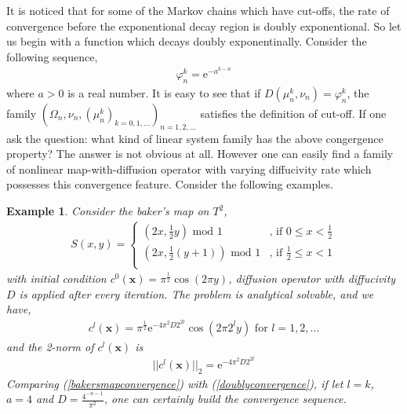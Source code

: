 \documentclass{article}
\newtheorem{example}{Example}
\begin{document}
It is noticed that for some of the Markov chains which have
cut-offs, the rate of convergence before the exponentional decay
region is doubly exponentional. So let us begin with a function
which decays doubly exponentinally. Consider the following sequence,
 \begin{eqnarray}
 \label{doublyconvergence}
 \varphi^k_n = \text{e}^{-a^{k-n}}
 \end{eqnarray}
 where $a>0$ is a real number. It is easy to see that if $D(\mu^k_n,\nu_n)=\varphi^k_n
 $, the family $(\Omega_n,\nu_n, (\mu^k_n)_{k=0,1,...})_{n=1,2,...}$ satisfies the definition of cut-off. If
 one ask the question: what kind of linear system family has the above
 congergence property? The answer is not obvious at all. However one
 can easily find a family of nonlinear map-with-diffusion operator with varying diffucivity rate which possesses this
 convergence feature. Consider the following examples.

\begin{example}

Consider the baker's map on $T^2$,
  \begin{eqnarray}
    S(x,y) =  \left\{ \begin{array}{cc}
                 (2x,\frac{1}{2}y) \mbox{ mod } 1      &\mbox{, if } 0\le x < \frac{1}{2} \\
                 (2x,\frac{1}{2}(y+1)) \mbox{ mod } 1  &\mbox{, if } \frac{1}{2}\le x< 1\\
              \end{array} \right.
  \end{eqnarray}
with initial condition $c^0(\mathbf{x})= \pi^{\frac{1}{2}}\cos(2 \pi
y)$, diffusion operator with diffucivity $D$ is applied after every
iteration. The problem is analytical solvable, and we have,
  \begin{eqnarray}
   c^l(\mathbf{x}) = \pi^{\frac{1}{2}}\text{e}^{-4 \pi^2 D 2 ^{2 l}}\cos(2 \pi 2^l
   y) \mbox{ for }l = 1,2,...
  \end{eqnarray}
and the 2-norm of $c^l(\mathbf{x})$ is
  \begin{eqnarray}
  \label{bakersmapconvergence}
   ||c^l(\mathbf{x})||_2 = \text{e}^{-4 \pi^2 D 2 ^{2 l}}
  \end{eqnarray}
Comparing (\ref{bakersmapconvergence}) with
(\ref{doublyconvergence}), if let $l=k$, $a=4$ and $D =\frac{4^{-n-1}}{\pi^2}$,
one can certainly build the convergence sequence.
\end{example}
\end{document}
